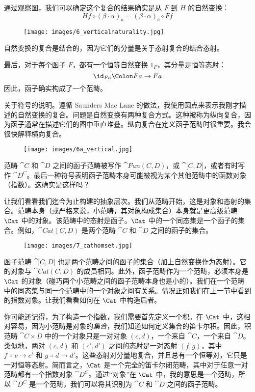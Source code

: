 \noindent
通过观察图，我们可以确定这个复合的结果确实是从 $F$ 到 $H$ 的自然变换：
\[H f \circ (\beta \cdot \alpha)_a = (\beta \cdot \alpha)_b \circ F f\]

\begin{figure}[H]
  \centering
  \texttt{[image: images/6\_verticalnaturality.jpg]}
\end{figure}

\noindent
自然变换的复合是结合的，因为它们的分量是关于态射复合的结合态射。

最后，对于每个函子 $F$，都有一个恒等自然变换 $1_F$，其分量是恒等态射：
\[\id_{F a} \Colon F a \to F a\]
因此，函子确实构成了一个范畴。

关于符号的说明。遵循 Saunders Mac Lane 的做法，我使用圆点来表示我刚才描述的自然变换的复合。问题是自然变换有两种复合方式。这种被称为纵向复合，因为函子通常在描述它们的图中垂直堆叠。纵向复合在定义函子范畴时很重要。我会很快解释横向复合。

\begin{figure}[H]
  \centering
  \texttt{[image: images/6a\_vertical.jpg]}
\end{figure}

\noindent
范畴 $\cat{C}$ 和 $\cat{D}$ 之间的函子范畴被写作 $\cat{Fun(C, D)}$，或 $\cat{{[}C, D{]}}$，或者有时写作 $\cat{D^C}$。最后一种符号表明函子范畴本身可能被视为某个其他范畴中的函数对象（指数）。这确实是这样吗？

让我们看看我们迄今为止构建的抽象层次。我们从范畴开始，这是对象和态射的集合。范畴本身（或严格来说，小范畴，其对象构成集合）本身就是更高级范畴 $\Cat$ 中的对象。该范畴中的态射是函子。$\Cat$ 中的一个同态集是一个函子的集合。例如，$\cat{Cat(C, D)}$ 是两个范畴 $\cat{C}$ 和 $\cat{D}$ 之间的函子的集合。

\begin{figure}[H]
  \centering
  \texttt{[image: images/7\_cathomset.jpg]}
\end{figure}

\noindent
函子范畴 $\cat{{[}C, D{]}}$ 也是两个范畴之间的函子的集合（加上自然变换作为态射）。它的对象与 $\cat{Cat(C, D)}$ 的成员相同。此外，函子范畴作为一个范畴，必须本身是 $\Cat$ 的对象（碰巧两个小范畴之间的函子范畴本身也是小的）。我们在一个范畴中的同态集与同一个范畴中的一个对象之间有关系。情况正如我们在上一节中看到的指数对象。让我们看看如何在 $\Cat$ 中构造后者。

你可能还记得，为了构造一个指数，我们需要首先定义一个积。在 $\Cat$ 中，这相对容易，因为小范畴是对象的\emph{集合}，我们知道如何定义集合的笛卡尔积。因此，积范畴 $\cat{C\times D}$ 中的一个对象只是一对对象 $(c, d)$，一个来自 $\cat{C}$，一个来自 $\cat{D}$。类似地，两对 $(c, d)$ 和 $(c', d')$ 之间的态射是一对态射 $(f, g)$，其中 $f \Colon c \to c'$ 和 $g \Colon d \to d'$。这些态射对分量地复合，并且总有一个恒等对，它只是一对恒等态射。简而言之，$\Cat$ 是一个完全的笛卡尔闭范畴，其中对于任意一对范畴都有一个指数对象 $\cat{D^C}$。通过“对象”在 $\Cat$ 中，我的意思是一个范畴，所以 $\cat{D^C}$ 是一个范畴，我们可以将其识别为 $\cat{C}$ 和 $\cat{D}$ 之间的函子范畴。

